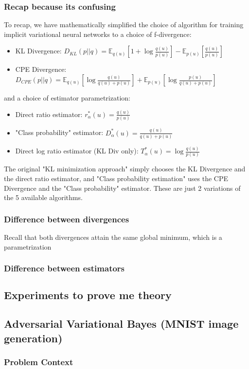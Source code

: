 \documentclass[a4paper,12pt]{article}
\numberwithin{equation}{section}
\begin{document}
\subsubsection{Recap because its confusing}
To recap, we have mathematically simplified the choice of algorithm for training implicit variational neural networks to a choice of f-divergence:
\begin{itemize}
\item KL Divergence: $D_{KL}(p||q)=\mathbb{E}_{q(u)}[1+\log \frac{q(u)}{p(u)}]-\mathbb{E}_{p(u)}\left[\frac{q(u)}{p(u)}\right]$
\item CPE Divergence: $D_{CPE}(p||q)=\mathbb{E}_{q(u)}\left[\log \frac{q(u)}{q(u)+p(u)}\right]+\mathbb{E}_{p(u)}\left[\log \frac{p(u)}{q(u)+p(u)}\right]$
\end{itemize}
and a choice of estimator parametrization:
\begin{itemize}
\item Direct ratio estimator: $r^*_\alpha(u)=\frac{q(u)}{p(u)}$
\item "Class probability" estimator: $D^*_\alpha(u)=\frac{q(u)}{q(u)+p(u)}$
\item Direct log ratio estimator (KL Div only): $T^*_\alpha(u)=\log \frac{q(u)}{p(u)}$
\end{itemize}
The original "KL minimization approach" simply chooses the KL Divergence and the direct ratio estimator, and "Class probability estimation" uses the CPE Divergence and the "Class probability" estimator. These are just 2 variations of the 5 available algorithms.
\subsubsection{Difference between divergences}
Recall that both divergences attain the same global minimum, which is a parametrization 
\subsubsection{Difference between estimators}



\subsection{Experiments to prove me theory}
\subsection{Adversarial Variational Bayes (MNIST image generation)}
\subsubsection{Problem Context}
\end{document}
